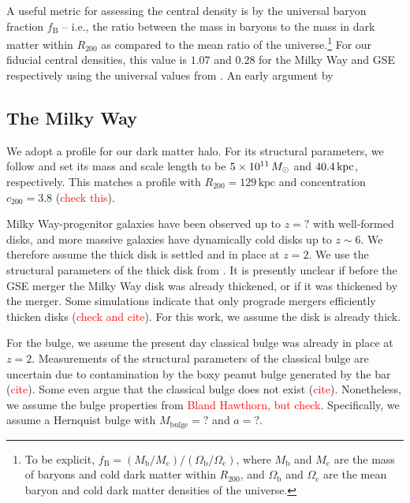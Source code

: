 A useful metric for assessing the central density is by the universal baryon
fraction $f_{\textrm{B}}$ -- i.e., the ratio between the mass in baryons to the
mass in dark matter within $R_{200}$ as compared to the mean ratio of the
universe.\footnote{To be explicit,
$f_{\textrm{B}}=(M_{\textrm{b}}/M_{\textrm{c}})/(\Omega_{\textrm{b}}/\Omega_{\textrm{c}})$,
where $M_{\textrm{b}}$ and $M_{\textrm{c}}$ are the mass of baryons and cold
dark matter within $R_{200}$, and $\Omega_{\textrm{b}}$ and
$\Omega_{\textrm{c}}$ are the mean baryon and cold dark matter densities of the
universe.} For our fiducial central densities, this value is $1.07$ and $0.28$
for the Milky Way and GSE respectively using the universal values from
\cite{2014AA...571A..16P}. An early argument by 

\subsection{The Milky Way}
We adopt a \citet{1990ApJ...356..359H} profile for our dark matter halo. For its
structural parameters, we follow \citet{2021ApJ...923...92N} and set its mass
and scale length to be $5\times10^{11}\,M_{\odot}$ and $40.4\,\textrm{kpc}$, respectively.
This matches a \citet{1996ApJ...462..563N} profile with
$R_{200}=129\,\textrm{kpc}$ and concentration $c_{200}=3.8$
(\textcolor{red}{check this}).

Milky Way-progenitor galaxies have been observed up to $z=?$ with well-formed
disks, and more massive galaxies have dynamically cold disks up to $z\sim6$. We
therefore assume the thick disk is settled and in place at $z=2$. We use the
structural parameters of the thick disk from . It is presently unclear if before
the GSE merger the Milky Way disk was already thickened, or if it was thickened
by the merger. Some simulations indicate that only prograde mergers efficiently
thicken disks (\textcolor{red}{check and cite}). For this work, we assume the
disk is already thick.

For the bulge, we assume the present day classical bulge was already in place at
$z=2$. Measurements of the structural parameters of the classical bulge are
uncertain due to contamination by the boxy peanut bulge generated by the bar
(\textcolor{red}{cite}). Some even argue that the classical bulge does not exist
(\textcolor{red}{cite}). Nonetheless, we assume the bulge properties from
\textcolor{red}{Bland Hawthorn, but check}. Specifically, we assume a Hernquist
bulge with $M_{\textrm{bulge}}=?$ and $a=?$.

